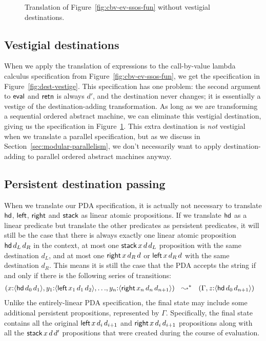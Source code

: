 \begin{figure}
\caption{Translation of Figure~\ref{fig:cbv-ev-ssos-fun} without vestigial destinations.}
\label{fig:dest-cbv}
\end{figure}



\subsection{Vestigial destinations}

When we apply the translation of expressions to the call-by-value
lambda calculus specification from Figure~\ref{fig:cbv-ev-ssos-fun},
we get the specification in Figure~\ref{fig:dest-vestige}.  This
specification has one problem: the second argument to ${\sf eval}$ and
${\sf retn}$ is always $d'$, and the destination never changes; it is
essentially a vestige of the destination-adding transformation. As
long as we are transforming a sequential ordered abstract machine, we
can eliminate this vestigial destination, giving us the specification
in Figure~\ref{fig:dest-cbv}. This extra destination is {\it not}
vestigial when we translate a parallel specification, but as we
discuss in Section~\ref{sec:modular-parallelism}, we don't necessarily
want to apply destination-adding to parallel ordered abstract machines
anyway.

\subsection{Persistent destination passing}
\label{sec:persistentdestpass}

When we translate our PDA specification, it is actually not necessary
to translate ${\sf hd}$, ${\sf left}$, ${\sf right}$ and ${\sf stack}$ as
linear atomic propositions. If we translate ${\sf hd}$ as
a linear predicate but translate the other predicates as persistent
predicates, it will still be the case that there is always exactly one
linear atomic proposition ${\sf hd}\,d_L\,d_R$ in the context, at most one
${\sf stack}\,x\,d\,d_L$ proposition with the same destination $d_L$, 
and at most one ${\sf right}\,x\,d_R\,d$ or ${\sf left}\,x\,d_R\,d$ 
with the same destination $d_R$. This means it is still the case that the
PDA accepts the string if and only if there is the following series of 
transitions:
\begin{align*}
(    x{:}\susp{{\sf hd}\,d_0\,d_1}, 
    y_1{:}\susp{{\sf left}\,x_1\,d_1\,d_2},
    \ldots&,
    y_n{:}\susp{{\sf right}\,x_n\,d_n\,d_{n+1}})%
~~ \leadsto^* ~~
(\Gamma, z{:}\susp{{\sf hd}\,d_0\,d_{n+1}})%
\end{align*}
Unlike the entirely-linear PDA specification, the final state may include
some additional 
persistent propositions, represented by $\Gamma$. Specifically, the final state
contains all the original ${\sf left}\,x\,d_i\,d_{i+1}$ and
${\sf right}\,x\,d_i\,d_{i+1}$ propositions 
along with all the ${\sf stack}\,x\,d\,d'$ propositions that were created
during the course of evaluation.


